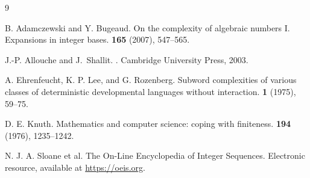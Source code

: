 \documentclass[12pt,reqno]{article}
\begin{document}
\begin{thebibliography}{9}

B. Adamczewski and Y. Bugeaud.
\newblock On the complexity of algebraic numbers {I.} {Expansions} in integer bases.
 {\bf 165} (2007), 547--565.

J.-P. Allouche and J.~Shallit.
.
\newblock  Cambridge University Press, 2003.

A. Ehrenfeucht, K. P. Lee, and G. Rozenberg.
\newblock Subword complexities of various classes of
deterministic developmental languages without interaction.
 {\bf 1} (1975), 59--75.

D. E. Knuth.
\newblock Mathematics and computer science:  coping with finiteness.
 {\bf 194} (1976), 1235--1242.

N. J. A. Sloane et al.
\newblock The On-Line Encyclopedia of Integer Sequences.
\newblock Electronic resource, available at
\url{https://oeis.org}.

\end{thebibliography}
\end{document}
